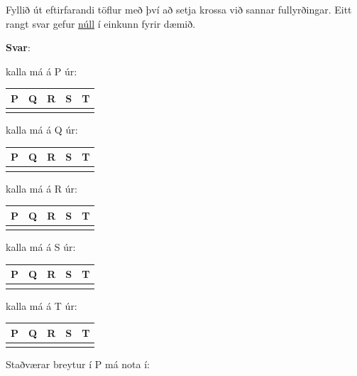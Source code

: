 \documentclass{article}
\begin{document}
     Fyllið út eftirfarandi töflur með því að setja krossa við sannar fullyrðingar.
     Eitt rangt svar gefur \underline{núll} í einkunn fyrir dæmið.

     \textbf{Svar}:

     kalla má á P úr:


     \begin{tabularx}{\textwidth}{ |X|X|X|X|X|}
        \hline
        \textbf{P}  & \textbf{Q}  & \textbf{R}  & \textbf{S}  & \textbf{T} \\ \hline
         & & & & \\ \hline
     \end{tabularx}


     kalla má á Q úr:

     
     \begin{tabularx}{\textwidth}{ |X|X|X|X|X|}
        \hline
        \textbf{P}  & \textbf{Q}  & \textbf{R}  & \textbf{S}  & \textbf{T} \\ \hline
         & & & & \\ \hline
     \end{tabularx}


     kalla má á R úr:

     
     \begin{tabularx}{\textwidth}{ |X|X|X|X|X|}
        \hline
        \textbf{P}  & \textbf{Q}  & \textbf{R}  & \textbf{S}  & \textbf{T} \\ \hline
         & & & & \\ \hline
     \end{tabularx}

     kalla má á S úr:

     
     \begin{tabularx}{\textwidth}{ |X|X|X|X|X|}
        \hline
        \textbf{P}  & \textbf{Q}  & \textbf{R}  & \textbf{S}  & \textbf{T} \\ \hline
         & & & & \\ \hline
     \end{tabularx}

     kalla má á T úr:

     
     \begin{tabularx}{\textwidth}{ |X|X|X|X|X|}
        \hline
        \textbf{P}  & \textbf{Q}  & \textbf{R}  & \textbf{S}  & \textbf{T} \\ \hline
         & & & & \\ \hline
     \end{tabularx}

     Staðværar breytur í P má nota í:
\end{document}
